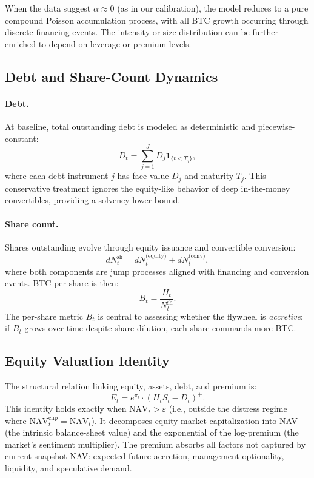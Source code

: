 When the data suggest $\alpha \approx 0$ (as in our calibration), the model reduces to a pure compound Poisson accumulation process, with all BTC growth occurring through discrete financing events. The intensity or size distribution can be further enriched to depend on leverage or premium levels.

\subsection{Debt and Share-Count Dynamics}

\paragraph{Debt.} At baseline, total outstanding debt is modeled as deterministic and piecewise-constant:
\begin{equation}
    D_t = \sum_{j=1}^J D_j \mathbf{1}_{\{t < T_j\}},
\end{equation}
where each debt instrument $j$ has face value $D_j$ and maturity $T_j$. This conservative treatment ignores the equity-like behavior of deep in-the-money convertibles, providing a solvency lower bound.

\paragraph{Share count.} Shares outstanding evolve through equity issuance and convertible conversion:
\begin{equation}
    dN_t^{\text{sh}} = dN_t^{\text{(equity)}} + dN_t^{\text{(conv)}},
\end{equation}
where both components are jump processes aligned with financing and conversion events. BTC per share is then:
\begin{equation}
    B_t = \frac{H_t}{N_t^{\text{sh}}}.
\end{equation}
The per-share metric $B_t$ is central to assessing whether the flywheel is \emph{accretive}: if $B_t$ grows over time despite share dilution, each share commands more BTC.

\subsection{Equity Valuation Identity}

The structural relation linking equity, assets, debt, and premium is:
\begin{equation}
    E_t = e^{\pi_t} \cdot (H_t S_t - D_t)^+.
    \label{eq:equity_identity}
\end{equation}
This identity holds exactly when $\text{NAV}_t > \varepsilon$ (i.e., outside the distress regime where $\text{NAV}_t^{\text{clip}} = \text{NAV}_t$). It decomposes equity market capitalization into NAV (the intrinsic balance-sheet value) and the exponential of the log-premium (the market's sentiment multiplier). The premium absorbs all factors not captured by current-snapshot NAV: expected future accretion, management optionality, liquidity, and speculative demand.

